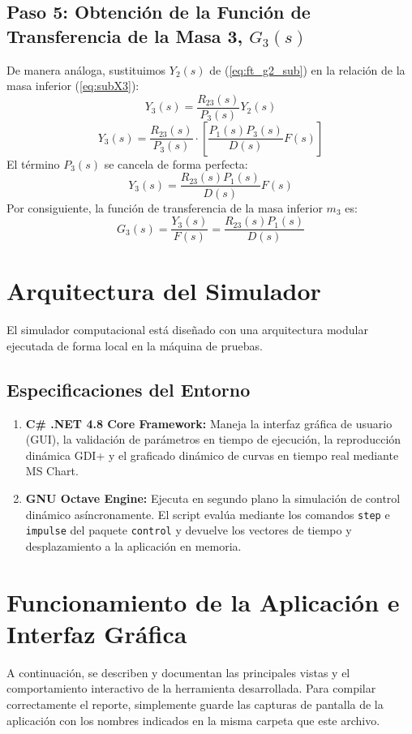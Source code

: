 \documentclass[12pt,letterpaper]{article}
\begin{document}
\subsection{Paso 5: Obtención de la Función de Transferencia de la Masa 3, $G_3(s)$}
De manera análoga, sustituimos $Y_2(s)$ de (\ref{eq:ft_g2_sub}) en la relación de la masa inferior (\ref{eq:subX3}):
\[ Y_3(s) = \frac{R_{23}(s)}{P_3(s)} Y_2(s) \]
\[ Y_3(s) = \frac{R_{23}(s)}{P_3(s)} \cdot \left[ \frac{P_1(s)P_3(s)}{D(s)} F(s) \right] \]
El término $P_3(s)$ se cancela de forma perfecta:
\[ Y_3(s) = \frac{R_{23}(s)P_1(s)}{D(s)} F(s) \]
Por consiguiente, la función de transferencia de la masa inferior $m_3$ es:
\begin{equation}
G_3(s) = \frac{Y_3(s)}{F(s)} = \frac{R_{23}(s)P_1(s)}{D(s)}
\label{eq:ft_g3_sub}
\end{equation}

\section{Arquitectura del Simulador}
El simulador computacional está diseñado con una arquitectura modular ejecutada de forma local en la máquina de pruebas.

\subsection{Especificaciones del Entorno}
\begin{enumerate}
    \item \textbf{C\# .NET 4.8 Core Framework:} Maneja la interfaz gráfica de usuario (GUI), la validación de parámetros en tiempo de ejecución, la reproducción dinámica GDI+ y el graficado dinámico de curvas en tiempo real mediante MS Chart.
    \item \textbf{GNU Octave Engine:} Ejecuta en segundo plano la simulación de control dinámico asíncronamente. El script evalúa mediante los comandos \texttt{step} e \texttt{impulse} del paquete \texttt{control} y devuelve los vectores de tiempo y desplazamiento a la aplicación en memoria.
\end{enumerate}

\section{Funcionamiento de la Aplicación e Interfaz Gráfica}
A continuación, se describen y documentan las principales vistas y el comportamiento interactivo de la herramienta desarrollada. Para compilar correctamente el reporte, simplemente guarde las capturas de pantalla de la aplicación con los nombres indicados en la misma carpeta que este archivo.
\end{document}
